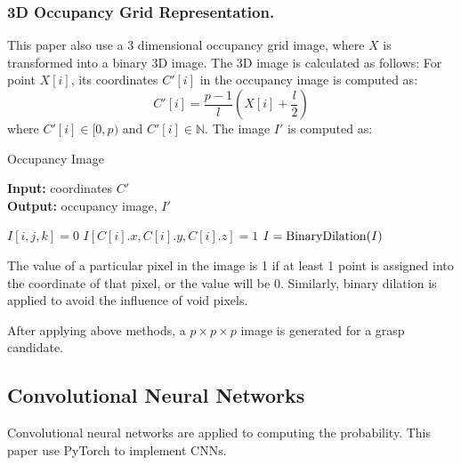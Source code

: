 \documentclass[letterpaper]{article} %
\begin{document}
\subsubsection{3D Occupancy Grid Representation.} This paper also use a 3 dimensional occupancy grid image, where $X$ is transformed into a binary 3D image. The 3D image is calculated as follows:
For point $X[i]$, its coordinates $C'[i]$ in the occupancy image is computed as:
\begin{equation}
    C'[i]=\frac{p-1}{l} (X[i]+\frac{l}{2})
\end{equation}
where $C'[i]\in [0, p)$ and $C'[i]\in \mathbb{N}$. The image $I'$ is computed as:
\begin{algorithm}[H]
\caption{Occupancy Image}
\textbf{Input:} coordinates $C'$\\
\textbf{Output:} occupancy image, $I'$\\
\begin{algorithmic}[1]
\STATE $I[i, j, k] = 0$
\ENDFOR
\ENDFOR
\ENDFOR
{}
\STATE $I[C[i].x, C[i].y, C[i].z]=1$
\ENDFOR
\STATE $I={\rm BinaryDilation}(I)$
\end{algorithmic}
\end{algorithm}

The value of a particular pixel in the image is 1 if at least 1 point is assigned into the coordinate of that pixel, or the value will be 0. Similarly, binary dilation \cite{BK1} is applied to avoid the influence of void pixels.

After applying above methods, a $p\times p\times p$ image is generated for a grasp candidate.

\subsection{Convolutional Neural Networks}
Convolutional neural networks are applied to computing the probability. This paper use PyTorch \cite{Pytorch} to implement CNNs.
\end{document}

